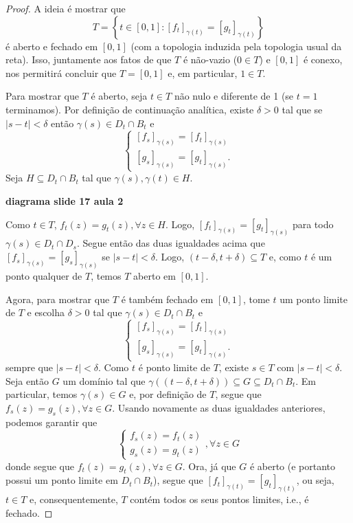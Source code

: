 \begin{proof}
A ideia é mostrar que
\begin{equation*}
    T = \left\{ t\in [0,1] : [f_t]_{\gamma(t)}= [g_t]_{\gamma(t)} \right\}
\end{equation*}
é aberto e fechado em $[0,1]$ (com a topologia induzida pela topologia usual da reta).
Isso, juntamente aos fatos de que $T$ é não-vazio ($0\in T$) e $[0,1]$ é conexo, 
nos permitirá concluir que $T = [0,1]$ e, em particular, $1\in T$.

Para mostrar que $T$ é aberto, seja $t\in T$ não nulo e diferente de 1 
(se $t=1$ terminamos). Por definição de continuação analítica, existe $\delta > 0$
tal que se $|s-t|<\delta$ então $\gamma(s) \in D_t\cap B_t$ e 
\begin{equation*}
    \begin{cases}
    [f_s]_{\gamma(s)} = [f_t]_{\gamma(s)} \\
    [g_s]_{\gamma(s)} = [g_t]_{\gamma(s)}.
    \end{cases}
\end{equation*}
Seja $H\subseteq D_t\cap B_t$ tal que $\gamma(s), \gamma(t)\in H$. 

\begin{center}
    \textbf{diagrama slide 17 aula 2}
\end{center}

Como $t\in T$,
$f_t(z) = g_t(z), \forall z\in H$. Logo, $[f_t]_{\gamma(s)} = [g_t]_{\gamma(s)}$
para todo $\gamma(s)\in D_t\cap D_s$. Segue então das duas igualdades acima que
$[f_s]_{\gamma(s)} = [g_s]_{\gamma(s)}$ se $|s-t|<\delta$. Logo, 
$(t-\delta, t+\delta)\subseteq T$ e, como $t$ é um ponto qualquer de $T$, temos
$T$ aberto em $[0,1]$.

Agora, para mostrar que $T$ é também fechado em $[0,1]$, tome $t$ um ponto limite 
de $T$ e escolha $\delta>0$ tal que $\gamma(s) \in D_t\cap B_t$ e
\begin{equation*}
    \begin{cases}
    [f_s]_{\gamma(s)} = [f_t]_{\gamma(s)} \\
    [g_s]_{\gamma(s)} = [g_t]_{\gamma(s)}.
    \end{cases}
\end{equation*}
sempre que $|s-t|<\delta$. Como $t$ é ponto limite de $T$, existe $s\in T$ com
$|s-t|<\delta$. Seja então $G$ um domínio tal que 
$\gamma((t-\delta, t+\delta))\subseteq G\subseteq D_t\cap B_t$.
Em particular, temos $\gamma(s)\in G$ e, por definição de $T$, segue que
$f_s(z) = g_s(z), \forall z\in G$. Usando novamente as duas igualdades anteriores, 
podemos garantir que
\begin{equation*}
    \begin{cases}
    f_s(z) = f_t(z) \\
    g_s(z) = g_t(z)
    \end{cases}, \forall z\in G
\end{equation*}
donde segue que $f_t(z) = g_t(z), \forall z\in G$. Ora, já que $G$ é aberto 
(e portanto possui um ponto limite em $D_t\cap B_t$), segue que 
$[f_t]_{\gamma(t)} = [g_t]_{\gamma(t)}$, ou seja, $t\in T$ e, consequentemente,
$T$ contém todos os seus pontos limites, i.e., é fechado.
\end{proof}


